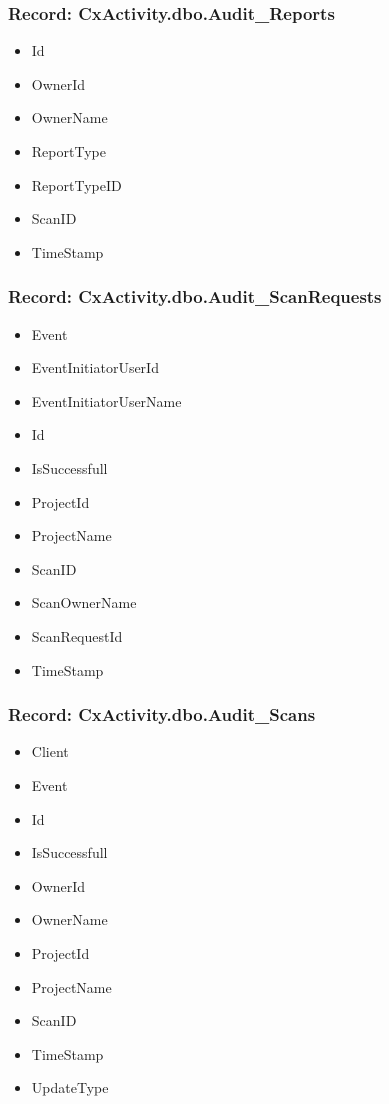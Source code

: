 \subsubsection{Record: CxActivity.dbo.Audit\_Reports}
\begin{itemize}
    \item Id
    \item OwnerId
    \item OwnerName
    \item ReportType
    \item ReportTypeID
    \item ScanID
    \item TimeStamp
\end{itemize}

\subsubsection{Record: CxActivity.dbo.Audit\_ScanRequests}
\begin{itemize}
    \item Event
    \item EventInitiatorUserId
    \item EventInitiatorUserName
    \item Id
    \item IsSuccessfull
    \item ProjectId
    \item ProjectName
    \item ScanID
    \item ScanOwnerName
    \item ScanRequestId
    \item TimeStamp
\end{itemize}

\subsubsection{Record: CxActivity.dbo.Audit\_Scans}
\begin{itemize}
    \item Client
    \item Event
    \item Id
    \item IsSuccessfull
    \item OwnerId
    \item OwnerName
    \item ProjectId
    \item ProjectName
    \item ScanID
    \item TimeStamp
    \item UpdateType
\end{itemize}


